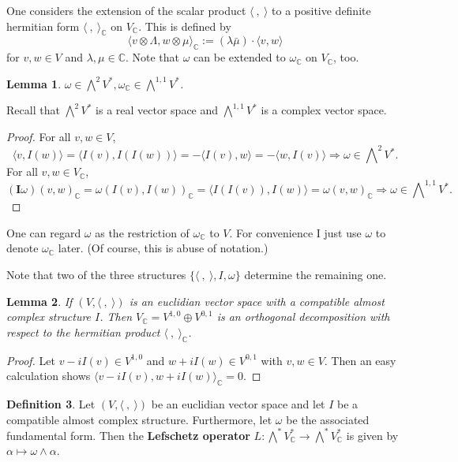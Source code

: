 \documentclass{article}
\theoremstyle{definition}
\newtheorem{definition}{Definition}[subsection]
\theoremstyle{plain}
\newtheorem{lemma}[definition]{Lemma}
\begin{document}
One considers the extension of the scalar product $ \langle\ ,\ \rangle $ to a positive definite hermitian form $ \langle\ ,\ \rangle_{\mathbb{C}} $ on $ V_{\mathbb{C}} $. This is defined by\[
    \langle v\otimes \Lambda, w\otimes\mu\rangle_{\mathbb{C}}:=(\lambda\bar{\mu})\cdot\langle v,w\rangle
\]for $ v,w\in V $ and $ \lambda,\mu\in\mathbb{C} $. Note that $ \omega $ can be extended to $ \omega_{\mathbb{C}} $ on $ V_{\mathbb{C}} $, too.

\begin{lemma}
    $ \omega\in \bigwedge^{2}V^*,\omega_{\mathbb{C}}\in\bigwedge^{1,1}V^* $.
\end{lemma}

Recall that $ \bigwedge^{2}V^* $ is a real vector space and $ \bigwedge^{1,1}V^* $ is a complex vector space.

\begin{proof}
    For all $ v,w\in V $,\[
        \langle v,I(w)\rangle=\langle I(v),I(I(w))\rangle=-\langle I(v),w\rangle=-\langle w,I(v)\rangle \Rightarrow \omega \in \bigwedge\nolimits^2 V^*.
    \]
    For all $ v,w\in V_{\mathbb{C}} $,\[
        (\mathrm{\mathbf{I}}\omega)(v,w)_{\mathbb{C}}=\omega(I(v),I(w))_{\mathbb{C}}=\langle I(I(v)),I(w)\rangle=\omega(v,w)_{\mathbb{C}} \Rightarrow \omega\in\bigwedge\nolimits^{1,1}V^*.
    \]
\end{proof}

One can regard $ \omega $ as the restriction of $ \omega_{\mathbb{C}} $ to $ V $. For convenience I just use $ \omega $ to denote $ \omega_{\mathbb{C}} $ later. (Of course, this is abuse of notation.)

Note that two of the three structures $ \lbrace\langle\ ,\ \rangle,I,\omega\rbrace $ determine the remaining one.


\begin{lemma}
    If $ (V,\langle\ ,\ \rangle) $ is an euclidian vector space with a compatible almost complex structure $ I $. Then $ V_{\mathbb{C}}=V^{1,0}\oplus V^{0,1} $ is an orthogonal decomposition with respect to the hermitian product $ \langle\ ,\ \rangle_{\mathbb{C}} $.
\end{lemma}

\begin{proof}
    Let $ v-iI(v)\in V^{1,0} $ and $ w+iI(w)\in V^{0,1} $ with $ v,w\in V $. Then an easy calculation shows $ \langle v-iI(v),w+iI(w)\rangle_{\mathbb{C}}=0 $.
\end{proof}

\begin{definition}
    Let $ (V,\langle\ ,\ \rangle) $ be an euclidian vector space and let $ I $ be a compatible almost complex structure. Furthermore, let $ \omega $ be the associated fundamental form. Then the \textbf{Lefschetz operator} $ L:\bigwedge^{*}V_{\mathbb{C}}^{*}\rightarrow\bigwedge^* V_{\mathbb{C}}^{*} $ is given by $ \alpha\mapsto \omega\wedge\alpha $.
\end{definition}
\end{document}
